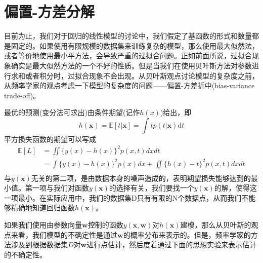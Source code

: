 \section{偏置-方差分解}
目前为止，我们对于回归的线性模型的讨论中，我们假定了基函数的形式和数量都是固定的。如果使用有限规模的数据集来训练复杂的模型，那么使用最大似然法，或者等价地使用最小平方法，会导致严重的过拟合问题。正如前面所说，过拟合现象确实是最大似然方法的一个不好的性质。但是当我们在使用贝叶斯方法对参数进行求和或者积分时，过拟合现象不会出现。从贝叶斯观点讨论模型的复杂度之前，从频率学家的观点考虑一下模型的复杂度的问题——偏置-方差折中(bias-variance trade-off)。

最优的预测(变分法可求出)由条件期望(记作$h(x)$)给出，即
\begin{equation}
	h(\boldsymbol{x})=\mathbb{E}[t|\boldsymbol{x}]=\int tp(t|\boldsymbol{x})\mathrm{d}t
\end{equation}
平方损失函数的期望可以写成
\begin{equation}
\label{llk}
\begin{aligned}
	\mathbb{E}[L]&=\iint \{y(x)-h(x)\}^2p(x,t)dxdt\\
	&=\int \{y(x)-h(x) \}^2p(x)dx + \iint \{h(x)-t\}^2p(x,t)dxdt\\
\end{aligned}
\end{equation}
与$y(\boldsymbol{x})$无关的第二项，是由数据本身的噪声造成的，表明期望损失能够达到的最小值。第一项与我们对函数$y(\boldsymbol{x})$的选择有关，我们要找一个$y(\boldsymbol{x})$的解，使得这一项最小。在实际应用中，我们的数据集D只有有限的N个数据点，从而我们不能够精确地知道回归函数$h(\boldsymbol{x})$。

如果我们使用由参数向量$\boldsymbol{w}$控制的函数$y(\boldsymbol{x},\boldsymbol{w})$对$h(\boldsymbol{x})$建模，那么从贝叶斯的观点来看，我们模型的不确定性是通过$\boldsymbol{w}$的概率分布来表示的。但是，频率学家的方法涉及到根据数据集$D$对$\boldsymbol{w}$进行点估计，然后度着通过下面的思想实验来表示估计的不确定性。


